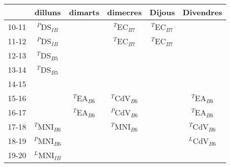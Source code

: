 \documentclass[border=10pt]{standalone}
\begin{document}
\begin{tabular}{c | c | c | c | c | c |}
	& dilluns	& dimarts	& dimecres	& Dijous	&	Divendres	\\\hline \hline
10-11	&$^P$DS$_{IB}$	&		&$^T$EC$_{B7}$	&$^T$EC$_{B7}$	&			\\\hline
11-12	&$^P$DS$_{IB}$	&		&$^T$EC$_{B7}$	&$^T$EC$_{B7}$	&			\\\hline
12-13	&$^T$DS$_{B5}$	&		&		&		&			\\\hline
13-14	&$^T$DS$_{B5}$	&		&		&		&			\\\hline
14-15	&		&		&		&		&			\\\hline
15-16	&		&$^T$EA$_{B6}$	&$^T$CdV$_{B6}$	&		&$^T$EA$_{B6}$		\\\hline
16-17	&		&$^T$EA$_{B6}$	&$^P$CdV$_{B6}$	&		&$^T$EA$_{B6}$		\\\hline
17-18	&$^T$MNI$_{B6}$	&		&$^T$MNI$_{B6}$	&		&$^T$CdV$_{B6}$		\\\hline
18-19	&$^P$MNI$_{B6}$	&		&		&		&$^L$CdV$_{B6}$		\\\hline
19-20	&$^L$MNI$_{IB}$	&		&		&		&			\\\hline
\end{tabular}
\end{document}
